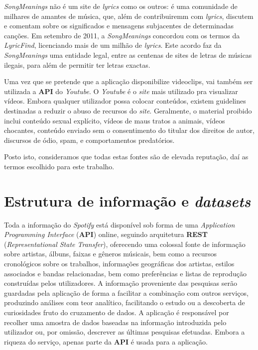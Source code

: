 \documentclass[twocolumn,twoside,11pt,a4paper]{article}
\begin{document}
\textit{SongMeanings} não é um site de \textit{lyrics} como os outros: é uma
comunidade de milhares de amantes de música, que, além de contribuiremm com
\textit{lyrics}, discutem e comentam sobre os significados e mensagens subjacentes de
determinadas canções.
Em setembro de 2011, a \textit{SongMeanings} concordou com os termos da
\textit{LyricFind}, licenciando mais de um milhão de \textit{lyrics}. Este acordo faz da
\textit{SongMeanings} uma entidade legal, entre as centenas de sites de letras de
músicas ilegais, para além de permitir ter letras exactas.


Uma vez que se pretende que a aplicação disponibilize videoclips, vai também ser
utilizada a \textbf{API} do \textit{Youtube}. O \textit{Youtube} é o \textit{site} mais
utilizado pra visualizar vídeos. Embora qualquer utilizador possa colocar conteúdos,
existem guidelines destinadas a reduzir o abuso de recursos do \textit{site}. Geralmente,
o material proibido inclui conteúdo sexual explícito, vídeos de maus tratos a animais,
vídeos chocantes, conteúdo enviado sem o consentimento do titular dos direitos de
autor, discursos de ódio, spam, e comportamentos predatórios.


Posto isto, consideramos que todas estas fontes são de elevada reputação, daí as
termos escolhido para este trabalho.



\section{Estrutura de informação e \textit{datasets}}\label{sec:structure}

Toda a informação do \textit{Spotify} está disponível sob forma de uma
\textit{Application Programming Interface} (\textbf{API}) online, seguindo arquitetura
\textbf{REST} (\textit{Representational State Transfer}), oferecendo uma
colossal fonte de informação sobre artistas, álbuns, faixas e gêneros músicais, bem
como a recursos cronológicos sobre os trabalhos, informações geográficas dos
artistas, estilos associados e bandas relacionadas, bem como preferências e listas de
reprodução construídas pelos utilizadores.
A informação proveniente das pesquisas serão guardadas pela aplicação de forma a facilitar
a combinação com outros serviços, produzindo análises com teor analítico, facilitando o
estudo ou a descoberta de curiosidades fruto do cruzamento de dados.
A aplicação é responsável por recolher uma amostra de dados baseadas na informação introduzida
pelo utilizador ou, por omissão, descrever as últimas pesquisas efetuadas.
Embora a riqueza do serviço, apenas parte da \textbf{API} é usada para a aplicação.
\end{document}
